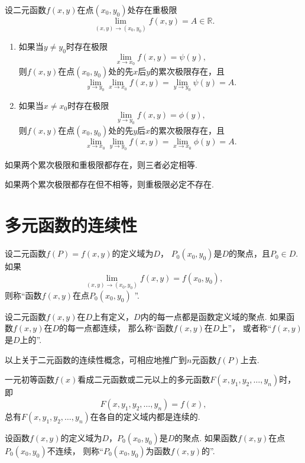 \begin{theorem}
设二元函数\(f(x,y)\)在点\((x_0,y_0)\)处存在重极限\[
	\lim\limits_{(x,y)\to(x_0,y_0)} f(x,y) = A \in \mathbb{R}.
\]\begin{enumerate}
	\item 如果当\(y \neq y_0\)时存在极限\[
		\lim\limits_{x \to x_0} f(x,y) = \psi(y),
	\]
	则\(f(x,y)\)在点\((x_0,y_0)\)处的先\(x\)后\(y\)的累次极限存在，且\[
		\lim\limits_{y \to y_0} \lim\limits_{x \to x_0} f(x,y)
		= \lim\limits_{y \to y_0} \psi(y) = A.
	\]

	\item 如果当\(x \neq x_0\)时存在极限\[
		\lim\limits_{y \to y_0} f(x,y) = \phi(y),
	\]
	则\(f(x,y)\)在点\((x_0,y_0)\)处的先\(y\)后\(x\)的累次极限存在，且\[
		\lim\limits_{x \to x_0} \lim\limits_{y \to y_0} f(x,y)
		= \lim\limits_{x \to x_0} \phi(y) = A.
	\]
\end{enumerate}
\end{theorem}

\begin{corollary}
如果两个累次极限和重极限都存在，则三者必定相等.
\end{corollary}

\begin{corollary}
如果两个累次极限都存在但不相等，则重极限必定不存在.
\end{corollary}

\section{多元函数的连续性}
\begin{definition}
设二元函数\(f(P)=f(x,y)\)的定义域为\(D\)，
\(P_0(x_0,y_0)\)是\(D\)的聚点，且\(P_0 \in D\).
如果\[
	\lim\limits_{(x,y)\to(x_0,y_0)} f(x,y) = f(x_0,y_0),
\]
则称“函数\(f(x,y)\)在点\(P_0(x_0,y_0)\) ”.

设二元函数\(f(x,y)\)在\(D\)上有定义，\(D\)内的每一点都是函数定义域的聚点.
如果函数\(f(x,y)\)在\(D\)的每一点都连续，
那么称“函数\(f(x,y)\)在\(D\)上”，
或者称“\(f(x,y)\)是\(D\)上的”.
\end{definition}
以上关于二元函数的连续性概念，可相应地推广到\(n\)元函数\(f(P)\)上去.

一元初等函数\(f(x)\)看成二元函数或二元以上的多元函数\(F(x,y_1,y_2,\dotsc,y_n)\)时，即\[
	F(x,y_1,y_2,\dotsc,y_n) = f(x),
\]
总有\(F(x,y_1,y_2,\dotsc,y_n)\)在各自的定义域内都是连续的.

\begin{definition}
设函数\(f(x,y)\)的定义域为\(D\)，\(P_0(x_0,y_0)\)是\(D\)的聚点.
如果函数\(f(x,y)\)在点\(P_0(x_0,y_0)\)不连续，
则称“\(P_0(x_0,y_0)\)为函数\(f(x,y)\)的”.
\end{definition}

